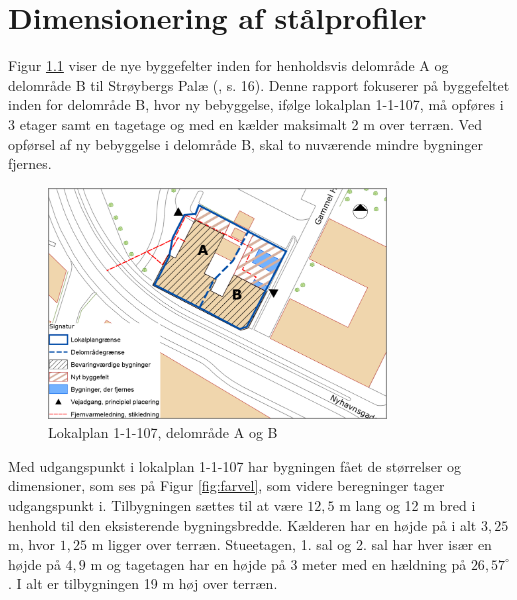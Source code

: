 \chapter{Dimensionering af stålprofiler}

Figur \ref{fig:hej} viser de nye byggefelter inden for henholdsvis delområde A og delområde B til Strøybergs Palæ (\citep{lokalplan}, s. 16). Denne rapport fokuserer på byggefeltet inden for delområde B, hvor ny bebyggelse, ifølge lokalplan 1-1-107, må opføres i 3 etager samt en tagetage og med en kælder maksimalt 2 m over terræn. Ved opførsel af ny bebyggelse i delområde B, skal to nuværende mindre bygninger fjernes. 

\begin{figure}[htbp]
	\centering
	\includegraphics[width=0.8\textwidth]{billeder/signatur.png}
	\caption{Lokalplan 1-1-107, delområde A og B \citep[ bilag 2, s. 35]{lokalplan}}
	\label{fig:hej}
\end{figure}

Med udgangspunkt i lokalplan 1-1-107 har bygningen fået de størrelser og dimensioner, som ses på Figur \ref{fig:farvel}, som videre beregninger tager udgangspunkt i.
\newline \indent{     }  Tilbygningen sættes til at være $12,\!5$ m lang og 12 m bred i henhold til den eksisterende bygningsbredde. Kælderen har en højde på i alt $3,\!25$ m, hvor $1,\!25$ m ligger over terræn. Stueetagen, 1. sal og 2. sal har hver især en højde på $4,\!9$ m og tagetagen har en højde på 3 meter med en hældning på $26,\!57^{\circ}$. I alt er tilbygningen 19 m høj over terræn.

